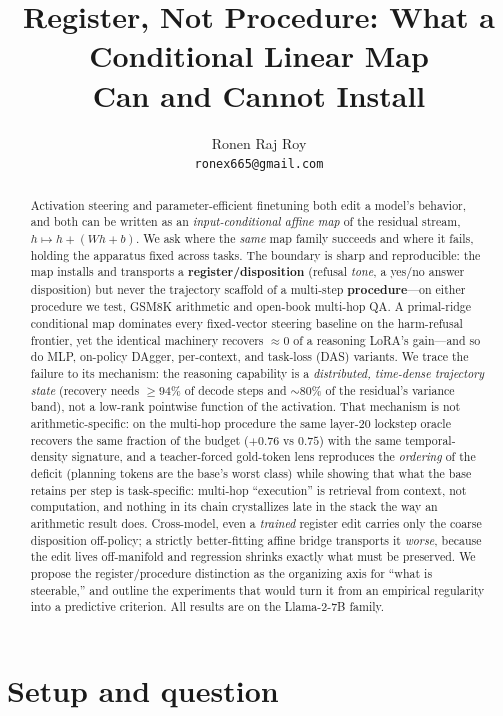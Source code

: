 \documentclass{article}
\title{Register, Not Procedure: What a Conditional Linear Map\\Can and Cannot Install}
\author{%
  Ronen Raj Roy\\
  \texttt{ronex665@gmail.com}\\
}
\begin{document}
\maketitle

\begin{abstract}
Activation steering and parameter-efficient finetuning both edit a model's behavior, and both can be
written as an \emph{input-conditional affine map} of the residual stream, $h \mapsto h + (Wh + b)$. We
ask where the \emph{same} map family succeeds and where it fails, holding the apparatus fixed across
tasks. The boundary is sharp and reproducible: the map installs and transports a
\textbf{register/disposition} (refusal \emph{tone}, a yes/no answer disposition) but never the
trajectory scaffold of a multi-step \textbf{procedure}---on either procedure we test, GSM8K
arithmetic and open-book multi-hop QA. A primal-ridge conditional map dominates every
fixed-vector steering baseline on the harm-refusal frontier, yet the identical machinery recovers
$\approx 0$ of a reasoning LoRA's gain---and so do MLP, on-policy DAgger, per-context, and task-loss
(DAS) variants. We trace the failure to its mechanism: the reasoning capability is a \emph{distributed,
time-dense trajectory state} (recovery needs ${\geq}94\%$ of decode steps and ${\sim}80\%$ of the
residual's variance band), not a low-rank pointwise function of the activation. That mechanism is not
arithmetic-specific: on the multi-hop procedure the same
layer-20 lockstep oracle recovers the same fraction of the budget ($+0.76$ vs $0.75$) with the same
temporal-density signature, and a teacher-forced gold-token lens reproduces the \emph{ordering} of the
deficit (planning tokens are the base's worst class) while showing that what the base retains per step
is task-specific: multi-hop ``execution'' is retrieval from context, not computation, and nothing in
its chain crystallizes late in the stack the way an arithmetic result does. Cross-model, even a
\emph{trained} register edit carries only the coarse disposition off-policy; a strictly better-fitting
affine bridge transports it \emph{worse}, because the edit lives off-manifold and regression shrinks
exactly what must be preserved. We propose the register/procedure distinction as the organizing axis
for ``what is steerable,'' and outline the experiments that would turn it from an empirical regularity
into a predictive criterion. All results are on the Llama-2-7B family.
\end{abstract}

\section{Setup and question}
\end{document}
